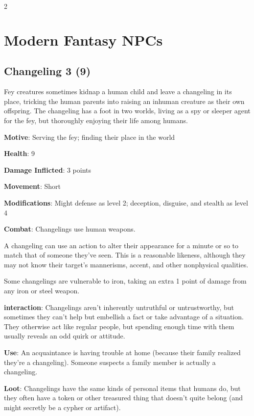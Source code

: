 \begin{multicols}{2}

\section{Modern Fantasy NPCs}

\subsection{Changeling 3 (9)}

Fey creatures sometimes kidnap a human child and leave a changeling in its place, tricking the human parents into raising an inhuman creature as their own offspring. The changeling has a foot in two worlds, living as a spy or sleeper agent for the fey, but thoroughly enjoying their life among humans.

\textbf{Motive}: Serving the fey; finding their place in the world 

\textbf{Health}: 9 

\textbf{Damage Inflicted}: 3 points 

\textbf{Movement}: Short 

\textbf{Modifications}: Might defense as level 2; deception, disguise, and stealth as level 4 

\textbf{Combat}: Changelings use human weapons. 

A changeling can use an action to alter their appearance for a minute or so to match that of someone they’ve seen. This is a reasonable likeness, although they may not know their target’s mannerisms, accent, and other nonphysical qualities. 

Some changelings are vulnerable to iron, taking an extra 1 point of damage from any iron or steel weapon. 

\textbf{interaction}: Changelings aren’t inherently untruthful or untrustworthy, but sometimes they can’t help but embellish a fact or take advantage of a situation. They otherwise act like regular people, but spending enough time with them usually reveals an odd quirk or attitude. 

\textbf{Use}: An acquaintance is having trouble at home (because their family realized they’re a changeling). Someone suspects a family member is actually a changeling. 

\textbf{Loot}: Changelings have the same kinds of personal items that humans do, but they often have a token or other treasured thing that doesn’t quite belong (and might secretly be a cypher or artifact).


\end{multicols}
